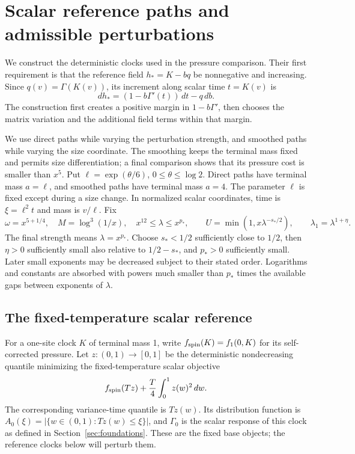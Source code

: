 \section{Scalar reference paths and admissible perturbations}
\label{sec:paths}

We construct the deterministic clocks used in the pressure comparison.
Their first requirement is that the reference field \(h_*=K-bq\)
be nonnegative and increasing. Since \(q(v)=\Gamma(K(v))\), its
increment along scalar time \(t=K(v)\) is
\[
 dh_*=(1-b\Gamma'(t))\,dt-q\,db.
\]
The construction first creates a positive margin in
\(1-b\Gamma'\), then chooses the matrix variation and the additional
field terms within that margin.

We use direct paths while varying the perturbation strength, and
smoothed paths while varying the size coordinate. The smoothing keeps
the terminal mass fixed and permits size differentiation; a final
comparison shows that its pressure cost is smaller than \(x^5\).
Put \(\ell=\exp(\theta/6)\),
\(0\le\theta\le\log2\). Direct paths have terminal mass \(a=\ell\),
and smoothed paths have terminal mass \(a=4\). The parameter \(\ell\)
is fixed except during a size change. In normalized scalar coordinates,
time is \(\xi=\ell^2t\) and mass is \(v/\ell\). Fix
\[
 \omega=x^{5+1/4},\quad M=\log^3(1/x),\quad
 x^{12}\le\lambda\le x^{p_*},\qquad
 U=\min(1,x\lambda^{-s_*/2}),\qquad \lambda_1=\lambda^{1+\eta}.
                                                               \tag{P1}\label{eq:P1}
\]
The final strength means \(\lambda=x^{p_*}\). Choose \(s_*<1/2\)
sufficiently close to \(1/2\), then \(\eta>0\) sufficiently small
also relative to \(1/2-s_*\), and \(p_*>0\) sufficiently small.
Later small exponents may be decreased subject to their stated order.
Logarithms and constants are absorbed with powers much smaller than
\(p_*\) times the available gaps between exponents of \(\lambda\).

\subsection{The fixed-temperature scalar reference}

For a one-site clock \(K\) of terminal mass 1, write
\(f_{\rm spin}(K)=f_1(0,K)\) for its self-corrected pressure. Let
\(z:(0,1)\to[0,1]\) be the deterministic nondecreasing quantile
minimizing the fixed-temperature scalar objective
\[
 f_{\rm spin}(Tz)+\frac T4\int_0^1z(w)^2\,dw.
\]
The corresponding variance-time quantile is \(Tz(w)\). Its distribution
function is
\(A_0(\xi)=|\{w\in(0,1):Tz(w)\le\xi\}|\), and \(\Gamma_0\)
is the scalar response of this clock as defined in
Section~\ref{sec:foundations}. These are the fixed base objects;
the reference clocks below will perturb them.

